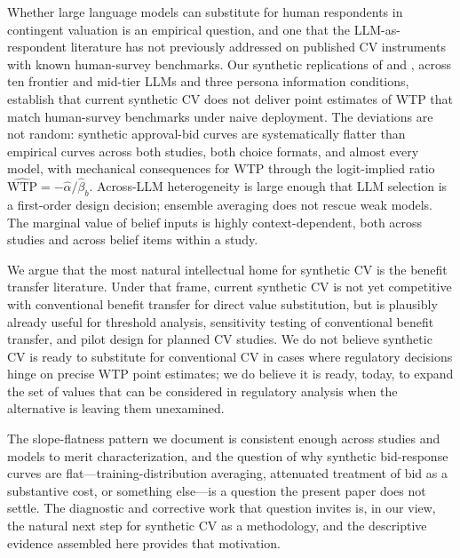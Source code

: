 \documentclass[12pt]{article}
\begin{document}
Whether large language models can substitute for human respondents in
contingent valuation is an empirical question, and one that the
LLM-as-respondent literature has not previously addressed on published
CV instruments with known human-survey benchmarks. Our synthetic
replications of \textcite{Aldy2012} and \textcite{Giguere2020}, across
ten frontier and mid-tier LLMs and three persona information conditions,
establish that current synthetic CV does not deliver point estimates of
WTP that match human-survey benchmarks under naive deployment. The
deviations are not random: synthetic approval-bid curves are
systematically flatter than empirical curves across both studies, both
choice formats, and almost every model, with mechanical consequences for
WTP through the logit-implied ratio
$\widehat{\text{WTP}} = -\hat{\alpha}/\hat{\beta}_b$. Across-LLM
heterogeneity is large enough that LLM selection is a first-order design
decision; ensemble averaging does not rescue weak models. The marginal
value of belief inputs is highly context-dependent, both across studies
and across belief items within a study.

We argue that the most natural intellectual home for synthetic CV is the
benefit transfer literature. Under that frame, current synthetic CV is
not yet competitive with conventional benefit transfer for direct value
substitution, but is plausibly already useful for threshold analysis,
sensitivity testing of conventional benefit transfer, and pilot design
for planned CV studies. We do not believe synthetic CV is ready to
substitute for conventional CV in cases where regulatory decisions hinge
on precise WTP point estimates; we do believe it is ready, today, to
expand the set of values that can be considered in regulatory analysis
when the alternative is leaving them unexamined.

The slope-flatness pattern we document is consistent enough across
studies and models to merit characterization, and the question of why
synthetic bid-response curves are flat---training-distribution
averaging, attenuated treatment of bid as a substantive cost, or
something else---is a question the present paper does not settle. The
diagnostic and corrective work that question invites is, in our view,
the natural next step for synthetic CV as a methodology, and
the descriptive evidence assembled here provides that motivation.

\newpage
\printbibliography
\end{document}
